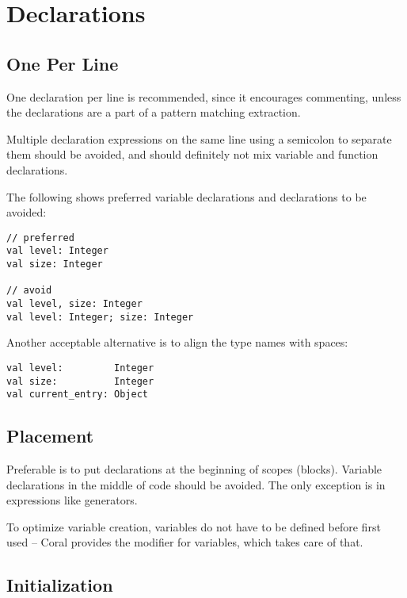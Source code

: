 \section{Declarations}






\subsection{One Per Line}

One declaration per line is recommended, since it encourages commenting, unless the declarations are a part of a pattern matching extraction. 

Multiple declaration expressions on the same line using a semicolon to separate them should be avoided, and should definitely not mix variable and function declarations. 

\example The following shows preferred variable declarations and declarations to be avoided:
\begin{lstlisting}
// preferred
val level: Integer
val size: Integer

// avoid
val level, size: Integer
val level: Integer; size: Integer
\end{lstlisting}

\example Another acceptable alternative is to align the type names with spaces: 
\begin{lstlisting}
val level:         Integer
val size:          Integer
val current_entry: Object
\end{lstlisting}





\subsection{Placement}

Preferable is to put declarations at the beginning of scopes (blocks). Variable declarations in the middle of code should be avoided. The only exception is in expressions like generators. 

To optimize variable creation, variables do not have to be defined before first used -- Coral provides the  modifier for variables, which takes care of that. 





\subsection{Initialization}

